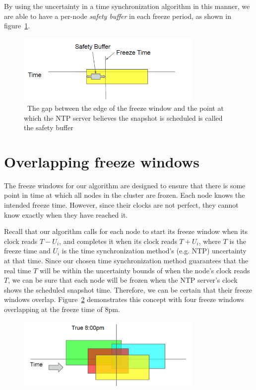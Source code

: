 By using the uncertainty in a time synchronization algorithm in this
manner, we are able to have a per-node \textit{safety buffer} in each
freeze period, as shown in figure~\ref{fig:safety-buff}.

\begin{figure}
\includegraphics[width=0.8\textwidth]{safety-diagram.png}
\caption{~The gap between the edge of the freeze window and the point at which the NTP server believes the snapshot is scheduled is called the safety buffer}
\label{fig:safety-buff}
\end{figure}

\section{Overlapping freeze windows}

The freeze windows for our algorithm are designed to ensure
that there is some point in time at which all nodes in the cluster are
frozen. Each node knows the intended freeze time. However, since their
clocks are not perfect, they cannot know exactly when they have reached it.

Recall that our algorithm calls for each node to start its freeze
window when its clock reads $T - U_i$, and completes it when its clock
reads $T + U_i$, where $T$ is the freeze time and $U_i$ is the time
synchronization method's (e.g. NTP) uncertainty at that time.  Since
our chosen time synchronization method guarantees that the real time
$T$ will be within the uncertainty bounds of when the node's clock
reads $T$, we can be sure that each node will be frozen when the NTP
server's clock shows the scheduled snapshot time. Therefore, we can be
certain that their freeze windows overlap.
Figure~\ref{fig:overlapping-windows} demonstrates this concept with
four freeze windows overlapping at the freeze time of 8pm.

\begin{figure}[h]
  \centering
  \caption{}
  \label{fig:overlapping-windows}
  \includegraphics[width=0.8\textwidth]{overlapping-windows.png}
\end{figure}
